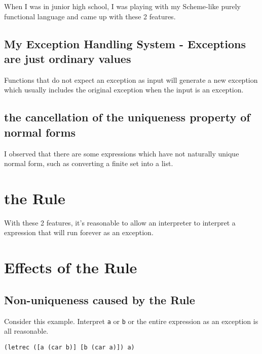 \documentclass[10pt,preprint,numbers]{sigplanconf}
\begin{document}
When I was in junior high school, I was playing with my Scheme-like purely functional language and
came up with these 2 features.

\subsection{My Exception Handling System - Exceptions are just ordinary values}

Functions that do not expect an exception as input will generate a new exception which usually includes the original exception when the input is an exception.

\subsection{the cancellation of the uniqueness property of normal forms}

I observed that there are some expressions which have not naturally unique normal form, such as converting a finite set into a list.

\section{the Rule}

With these 2 features,
it's reasonable to allow an interpreter to interpret a expression that will run forever as an exception.

\section{Effects of the Rule}

\subsection{Non-uniqueness caused by the Rule}

Consider this example. Interpret {\scriptsize\verb|a|} or {\scriptsize\verb|b|} or the entire expression as an exception is all reasonable.
\lstset{language=Lisp}
\begin{lstlisting}[frame=single]
(letrec ([a (car b)] [b (car a)]) a)
\end{lstlisting}



\end{document}
